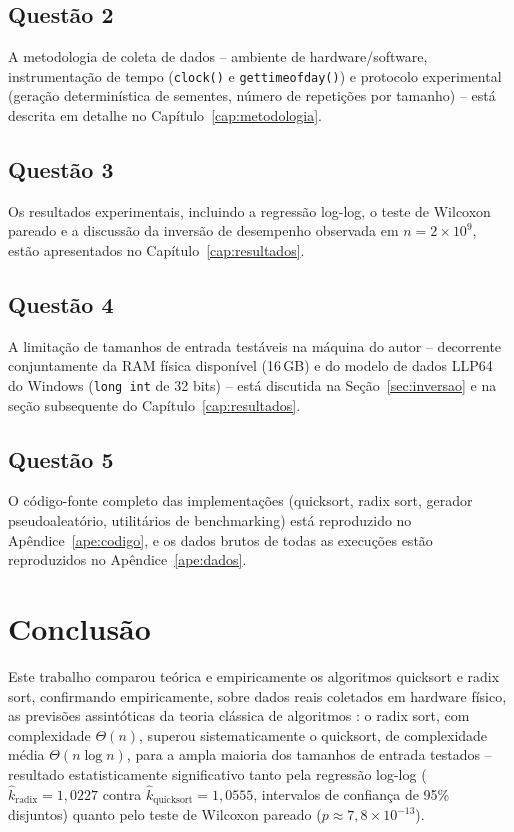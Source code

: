 \documentclass[
	12pt,
	oneside,
	a4paper,
	chapter=TITLE,
	section=TITLE,
	subsection=TITLE,
	subsubsection=TITLE,
	english,
	brazil
]{abntex2}
\theoremstyle{plain}
\theoremstyle{remark}
\renewcommand{\_}{\underscoreoriginal\allowbreak}
\begin{document}
\section{Questão 2}
A metodologia de coleta de dados -- ambiente de hardware/software, instrumentação de tempo (\texttt{clock()} e \texttt{gettimeofday()}) e protocolo experimental (geração determinística de sementes, número de repetições por tamanho) -- está descrita em detalhe no Capítulo~\ref{cap:metodologia}.

\section{Questão 3}
Os resultados experimentais, incluindo a regressão log-log, o teste de Wilcoxon pareado e a discussão da inversão de desempenho observada em $n=2\times10^{9}$, estão apresentados no Capítulo~\ref{cap:resultados}.

\section{Questão 4}
A limitação de tamanhos de entrada testáveis na máquina do autor -- decorrente conjuntamente da RAM física disponível (16\,GB) e do modelo de dados LLP64 do Windows (\texttt{long int} de 32 bits) -- está discutida na Seção~\ref{sec:inversao} e na seção subsequente do Capítulo~\ref{cap:resultados}.

\section{Questão 5}
O código-fonte completo das implementações (quicksort, radix sort, gerador pseudoaleatório, utilitários de benchmarking) está reproduzido no Apêndice~\ref{ape:codigo}, e os dados brutos de todas as execuções estão reproduzidos no Apêndice~\ref{ape:dados}.

\chapter{Conclusão}
\label{cap:conclusao}

Este trabalho comparou teórica e empiricamente os algoritmos quicksort e radix sort, confirmando empiricamente, sobre dados reais coletados em hardware físico, as previsões assintóticas da teoria clássica de algoritmos \cite{cormen2009}: o radix sort, com complexidade $\Theta(n)$, superou sistematicamente o quicksort, de complexidade média $\Theta(n \log n)$, para a ampla maioria dos tamanhos de entrada testados -- resultado estatisticamente significativo tanto pela regressão log-log ($\hat{k}_{\text{radix}} = 1{,}0227$ contra $\hat{k}_{\text{quicksort}} = 1{,}0555$, intervalos de confiança de 95\% disjuntos) quanto pelo teste de Wilcoxon pareado ($p \approx 7{,}8\times10^{-13}$).
\end{document}
